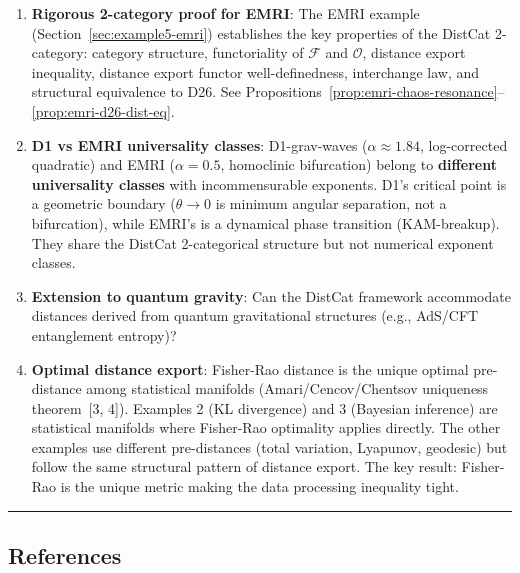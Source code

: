 \documentclass[
]{article}
\providecommand{\tightlist}{%
  \setlength{\itemsep}{0pt}\setlength{\parskip}{0pt}}
\begin{document}
\begin{enumerate}
\def\labelenumi{\arabic{enumi}.}
\tightlist
\item
  \textbf{Rigorous 2-category proof for EMRI}: The EMRI example
  (Section~\ref{sec:example5-emri}) establishes the key properties of
  the DistCat 2-category: category structure, functoriality of
  $\mathcal{F}$ and $\mathcal{O}$, distance export inequality,
  distance export functor well-definedness, interchange law, and
  structural equivalence to D26. See Propositions~\ref{prop:emri-chaos-resonance}--\ref{prop:emri-d26-dist-eq}.
\item
  \textbf{D1 vs EMRI universality classes}: D1-grav-waves
  ($\alpha \approx 1.84$, log-corrected quadratic) and EMRI
  ($\alpha = 0.5$, homoclinic bifurcation) belong to \textbf{different
  universality classes} with incommensurable exponents. D1's critical
  point is a geometric boundary ($\theta \to 0$ is minimum angular
  separation, not a bifurcation), while EMRI's is a dynamical phase
  transition (KAM-breakup). They share the DistCat 2-categorical
  structure but not numerical exponent classes.
\item
  \textbf{Extension to quantum gravity}: Can the DistCat framework
  accommodate distances derived from quantum gravitational structures
  (e.g., AdS/CFT entanglement entropy)?
\item
  \textbf{Optimal distance export}: Fisher-Rao distance is the unique
  optimal pre-distance among statistical manifolds
  (Amari/Cencov/Chentsov uniqueness theorem~[3, 4]). Examples 2 (KL divergence)
  and 3 (Bayesian inference) are statistical manifolds where Fisher-Rao
  optimality applies directly. The other examples use different pre-distances
  (total variation, Lyapunov, geodesic) but follow the same structural
  pattern of distance export. The key result: Fisher-Rao is the unique
  metric making the data processing inequality tight.
\end{enumerate}

\begin{center}\rule{0.5\linewidth}{0.5pt}\end{center}

\subsection{References}\label{references}
\end{document}

